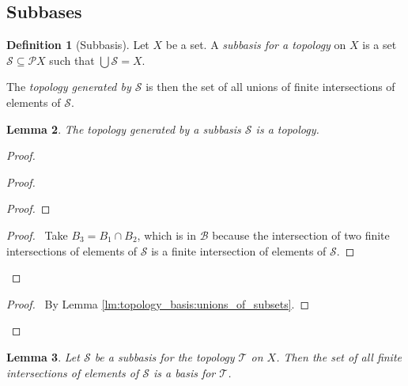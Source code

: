 \documentclass{book}
\newtheorem{lm}{Lemma}[chapter]
\theoremstyle{definition}
\newtheorem{df}[lm]{Definition}
\begin{document}
  \subsection{Subbases}
  
  \begin{df}[Subbasis]
    Let $X$ be a set. A \emph{subbasis for a topology} on $X$ is a set 
    $\mathcal{S} \subseteq \mathcal{P} X$ such that $\bigcup \mathcal{S} = X$.
    
    The \emph{topology generated by $\mathcal{S}$} is then the set of all unions 
    of 
    finite intersections of elements of $\mathcal{S}$.
  \end{df}
  
  \begin{lm}
    The topology generated by a subbasis $\mathcal{S}$ is a topology.
  \end{lm}
  
  \begin{proof}
    \begin{proof}
      \begin{proof}       
      \end{proof}
      \begin{proof}
        \pf\ Take $B_3 = B_1 \cap B_2$, which is in $\mathcal{B}$ because the 
        intersection of two finite intersections of elements of $\mathcal{S}$ is 
        a 
        finite intersection of elements of $\mathcal{S}$.
      \end{proof}
    \end{proof}
    \qedstep
    \begin{proof}
      \pf\ By Lemma \ref{lm:topology_basis:unions_of_subsets}.
    \end{proof}
  \end{proof}
  
  \begin{lm}
    \label{lm:topology:subbasis:basis}
    Let $\mathcal{S}$ be a subbasis for the topology $\mathcal{T}$ on $X$. Then 
    the set of all finite intersections of elements of $\mathcal{S}$ is a basis 
    for 
    $\mathcal{T}$.
  \end{lm}
  
\end{document}

